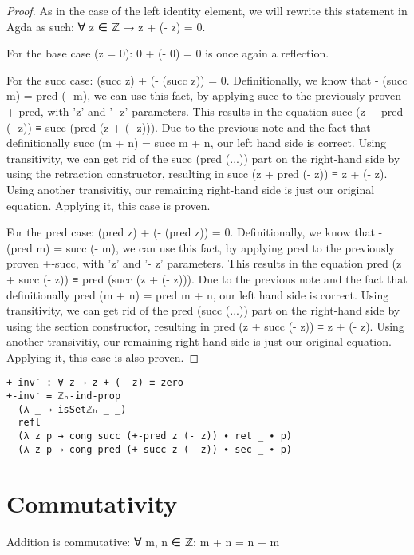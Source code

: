 \begin{proof}
  As in the case of the left identity element, we will rewrite this statement in Agda as such: ∀ z ∈ ℤ → z + (- z) = 0.

  For the base case (z = 0): 0 + (- 0) = 0 is once again a reflection.

  For the succ case: (succ z) + (- (succ z)) = 0. Definitionally, we know that - (succ m) = pred (- m), we can use this fact, by applying succ to the previously proven +-pred, with 'z' and '- z' parameters. This results in the equation succ (z + pred (- z)) ≡ succ (pred (z + (- z))). Due to the previous note and the fact that definitionally succ (m + n) = succ m + n, our left hand side is correct. Using transitivity, we can get rid of the succ (pred (...)) part on the right-hand side by using the retraction constructor, resulting in succ (z + pred (- z)) ≡ z + (- z). Using another transivitiy, our remaining right-hand side is just our original equation. Applying it, this case is proven.

  For the pred case: (pred z) + (- (pred z)) = 0. Definitionally, we know that - (pred m) = succ (- m), we can use this fact, by applying pred to the previously proven +-succ, with 'z' and '- z' parameters. This results in the equation pred (z + succ (- z)) ≡ pred (succ (z + (- z))). Due to the previous note and the fact that definitionally pred (m + n) = pred m + n, our left hand side is correct. Using transitivity, we can get rid of the pred (succ (...)) part on the right-hand side by using the section constructor, resulting in pred (z + succ (- z)) ≡ z + (- z). Using another transivitiy, our remaining right-hand side is just our original equation. Applying it, this case is also proven.
\end{proof}

\begin{listing}[H]
\begin{verbatim}
+-invʳ : ∀ z → z + (- z) ≡ zero
+-invʳ = ℤₕ-ind-prop
  (λ _ → isSetℤₕ _ _)
  refl
  (λ z p → cong succ (+-pred z (- z)) ∙ ret _ ∙ p)
  (λ z p → cong pred (+-succ z (- z)) ∙ sec _ ∙ p)
\end{verbatim}
\caption{Agda proof of addition having a right inverse element}
\end{listing}

\section{Commutativity}

\begin{theorem}
  Addition is commutative: ∀ m, n ∈ ℤ: m + n = n + m
\end{theorem}

